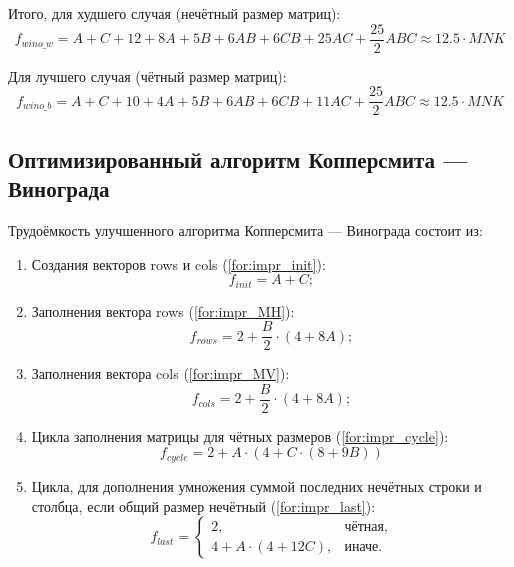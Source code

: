 \documentclass[12pt]{report}
\begin{document}
Итого, для худшего случая (нечётный размер матриц): 
\begin{equation}
\label{for:bad}
f_{wino\_w} = A + C + 12 + 8A + 5B + 6AB + 6CB + 25AC + \frac{25}{2}ABC \approx 12.5 \cdot MNK
\end{equation}

Для лучшего случая (чётный размер матриц): 
\begin{equation}
\label{for:good}
f_{wino\_b} = A + C + 10 + 4A + 5B + 6AB + 6CB + 11AC + \frac{25}{2}ABC \approx 12.5 \cdot MNK
\end{equation}

\subsection{Оптимизированный алгоритм Копперсмита — Винограда}

Трудоёмкость улучшенного алгоритма Копперсмита — Винограда состоит из:
\begin{enumerate}
	\item Создания векторов rows и cols (\ref{for:impr_init}):
	\begin{equation}
	\label{for:impr_init}
	f_{init} = A + C;
	\end{equation}
	
	\item Заполнения вектора rows (\ref{for:impr_MH}):
	\begin{equation}
	\label{for:impr_MH}
	f_{rows} = 2 + \frac{B}{2} \cdot (4 + 8A);
	\end{equation}
	
	\item Заполнения вектора cols (\ref{for:impr_MV}):
	\begin{equation}
	\label{for:impr_MV}
	f_{cols} = 2 + \frac{B}{2} \cdot (4 + 8A);
	\end{equation}
	
	\item Цикла заполнения матрицы для чётных размеров (\ref{for:impr_cycle}):
	\begin{equation}
	\label{for:impr_cycle}
	f_{cycle} = 2 + A \cdot (4 + C \cdot (8 + 9B))
	\end{equation}
	
	\item Цикла, для дополнения умножения суммой последних нечётных строки и столбца, если общий размер нечётный (\ref{for:impr_last}):
	\begin{equation}
	\label{for:impr_last}
	f_{last} = 
	\begin{cases}
	2, & \text{чётная,}\\
	4 + A \cdot (4 + 12C), & \text{иначе.}
	\end{cases}
	\end{equation}
\end{enumerate}
\end{document}
